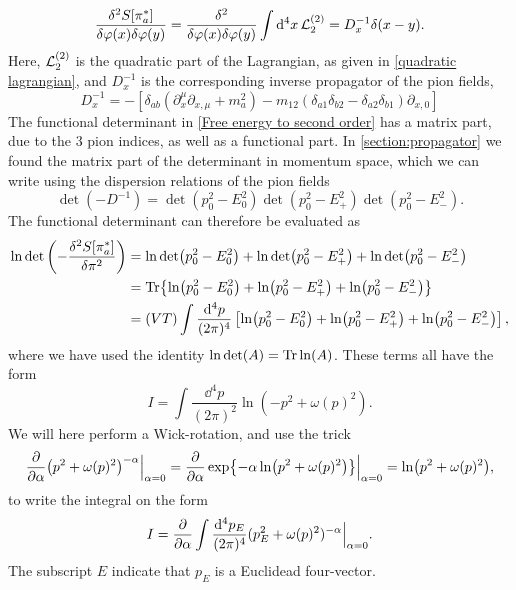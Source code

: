 \begin{align}
    \frac{\delta^2 S[\pi_a^*] }{\delta \varphi(x)\delta \varphi(y)}
    = \frac{\delta^2 }{\delta \varphi(x)\delta \varphi(y)} 
    \int \dd^4 x \, \mathcal{L}^{(2)}_2
    = D^{-1}_x \delta(x - y).
\end{align}
Here, $\mathcal{L}^{(2)}_2$ is the quadratic part of the Lagrangian, as given in \autoref{quadratic lagrangian}, and $D^{-1}_x$ is the corresponding inverse propagator of the pion fields,
\begin{equation}
    D_x^{-1} = 
    - \left[
        \delta_{ab}(\partial_x^\mu\partial_{x,\mu} + m^2_a)
        -  m_{12}(\delta_{a1} \delta_{b2} - \delta_{a2}\delta_{b1}) \partial_{x, 0}
    \right] 
\end{equation}
The functional determinant in \autoref{Free energy to second order} has a matrix part, due to the 3 pion indices, as well as a functional part.
In \autoref{section:propagator} we found the matrix part of  the determinant in momentum space, which we can write using the dispersion relations of the pion fields
\begin{equation}
    \det(- D^{-1}) = \det(p_0^2 - E_0^2) \det(p_0^2 - E_+^2) \det(p_0^2 - E_-^2).
\end{equation}
The functional determinant can therefore be evaluated as
\begin{align}
    \nonumber
    \ln{\det\left( - \frac{\delta^2 S[\pi_a^*]}{\delta \pi^2} \right)}
    & = \ln \det(p_0^2 - E_0^2) + \ln \det(p_0^2 - E_+^2) + \ln \det(p_0^2 - E_-^2) \\
    \nonumber
    & = \Tr{ \ln(p_0^2 - E_0^2) + \ln(p_0^2 - E_+^2)+  \ln(p_0^2 - E_-^2) } \\
    & = (VT) \int \frac{\dd^4 p}{(2 \pi)^4} 
    \left[ \ln(p_0^2 - E_0^2) + \ln(p_0^2 - E_+^2) + \ln(p_0^2 - E_-^2)  \right],
\end{align}
where we have used the identity $\ln\det(A) = \Tr \ln (A)$.
These terms all have the form
\begin{equation}
    I = \int \frac{\dd^4 p}{(2 \pi)^2} \ln(-p^2 + \omega(p)^2).
\end{equation}
We will here perform a Wick-rotation, and use the trick
\begin{equation}
    \pdv{\alpha} (p^2 + \omega(p)^2)^{-\alpha} \Big|_{\alpha=0}
    = \pdv{\alpha} \exp{-\alpha \ln(p^2 + \omega(p)^2) } \Big|_{\alpha=0}
    = \ln(p^2 + \omega(p)^2),
\end{equation}
to write the integral on the form
\begin{equation}
    I = \pdv{\alpha} \int \frac{\dd^4 p_E}{(2 \pi)^4} (p_E^2 + \omega(p)^2)^{-\alpha} \Big|_{\alpha=0}.
\end{equation}
The subscript $E$ indicate that $p_E$ is a Euclidead four-vector.

